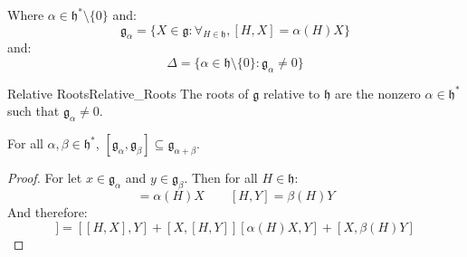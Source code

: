 \documentclass[crop=false,class=article]{standalone}                           %
\begin{document}
        Where $\alpha\in\mathfrak{h}^{*}\setminus\{0\}$ and:
        \begin{equation}
            \mathfrak{g}_{\alpha}
            =\{X\in\mathfrak{g}:\forall_{H\in\mathfrak{h}},[H,X]=\alpha(H)X\}
        \end{equation}
        and:
        \begin{equation}
            \Delta=\{\alpha\in\mathfrak{h}\setminus\{0\}:
                \mathfrak{g}_{\alpha}\ne{0}\}
        \end{equation}
        \begin{fdefinition}{Relative Roots}{Relative_Roots}
            The roots of $\mathfrak{g}$ relative to $\mathfrak{h}$ are the
            nonzero $\alpha\in\mathfrak{h}^{*}$ such that
            $\mathfrak{g}_{\alpha}\ne{0}$.
        \end{fdefinition}
        \begin{theorem}
            For all $\alpha,\beta\in\mathfrak{h}^{*}$,
            $[\mathfrak{g}_{\alpha},\mathfrak{g}_{\beta}]\subseteq
            \mathfrak{g}_{\alpha+\beta}$.
        \end{theorem}
        \begin{proof}
            For let $x\in\mathfrak{g}_{\alpha}$ and $y\in\mathfrak{g}_{\beta}$.
            Then for all $H\in\mathfrak{h}$:
            \begin{equation}
                [H,X]=\alpha(H)X
                \quad\quad
                [H,Y]=\beta(H)Y
            \end{equation}
            And therefore:
            \begin{equation}
                [H,[X,Y]]=
                [[H,X],Y]+[X,[H,Y]]
                [\alpha(H)X,Y]+[X,\beta(H)Y]
            \end{equation}
        \end{proof}
\end{document}

